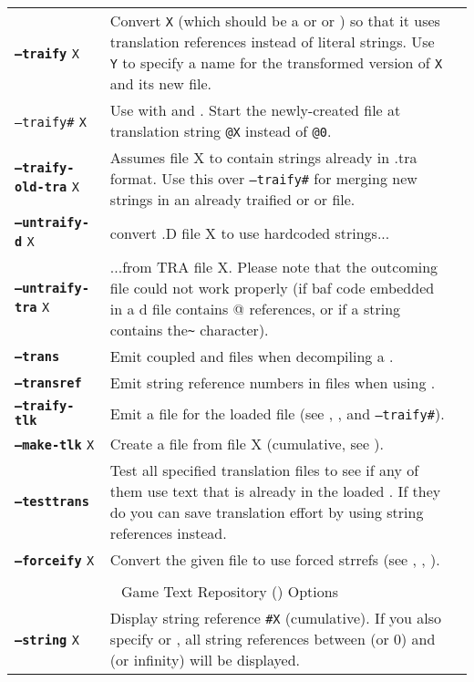 \documentclass{article}
\def\ttref#1{\ahrefloc{#1}{\tt #1}}
\def\DEFINE#1{{\tt \bf #1}\label{#1}\index{#1}}
\def\t#1{{\tt #1}}
\begin{document}
\begin{tabular}{lp{10in}|p{10in}}
\DEFINE{--traify} \t{X} & Convert \t{X} (which should be a \ttref{D} or \ttref{TP2} or \ttref{BAF}) so that it uses translation references instead of literal strings. Use \ttref{--out} \t{Y} to specify a name for the transformed version of \t{X} and its new \ttref{TRA} file. \\
\t{--traify\#} \t{X} &	Use with \ttref{--traify} and \ttref{--traify-tlk}. Start the newly-created \ttref{TRA} file at translation string {\tt @X} instead of {\tt @0}. \\
\DEFINE{--traify-old-tra} \t{X} & Assumes file X to contain strings already in .tra format.
Use this over \t{--traify\#} for merging new strings in an already traified \ttref{D} or \ttref{TP2} or \ttref{BAF} file.
\\
\DEFINE{--untraify-d} \t{X} & convert .D file X to use hardcoded strings... \\
\DEFINE{--untraify-tra} \t{X} & ...from TRA file X. Please note that the outcoming file
  could not work properly (if baf code embedded in a d file contains @ references, or if a string contains
  the\verb+~+ character). \\
\DEFINE{--trans} & Emit coupled \ttref{D} and \ttref{TRA} files when
  decompiling a \ttref{DLG}.  \\
\DEFINE{--transref} &	Emit string reference numbers in \ttref{TRA} files
when using \ttref{--trans}. \\
\DEFINE{--traify-tlk} & Emit a \ttref{TRA} file for the loaded \ttref{TLK} file (see \ttref{--tlkin}, \ttref{--out}, \ttref{--min} and \t{--traify\#}). \\
\DEFINE{--make-tlk} \t{X} & Create a \ttref{TLK} file from \ttref{TRA} file X (cumulative, see \ttref{--tlkout}). \\
\DEFINE{--testtrans} &	Test all specified \ttref{TRA} translation files to
see if any of them use text that is already in the loaded
\ttref{DIALOG.TLK}. If they do you can save translation effort by using
string references instead. \\
\DEFINE{--forceify} \t{X} & Convert the given \ttref{D} file to use forced
strrefs (see \ttref{--out}, \ttref{SAY}, \ttref{Forced String Reference}). \\
\\
\multicolumn{2}{c}{ \color{red} Game Text Repository (\ttref{TLK}) Options} \\
\DEFINE{--string} \t{X}&	Display string reference {\tt \#X} (cumulative). If you also specify \ttref{--min} or \ttref{--max}, all string references between \ttref{--min} (or 0) and \ttref{--max} (or infinity) will be displayed. \\

\end{tabular}
\end{document}
